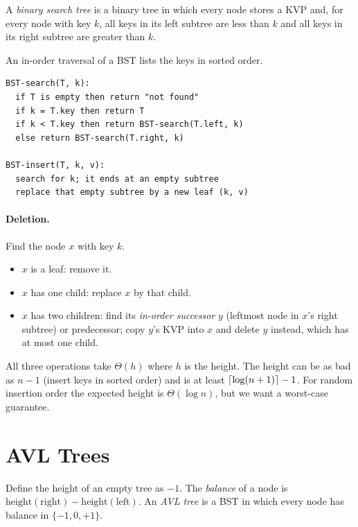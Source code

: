 \begin{definition}
A \emph{binary search tree} is a binary tree in which every node stores a KVP and,
for every node with key $k$, all keys in its left subtree are less than $k$ and
all keys in its right subtree are greater than $k$.
\end{definition}

An in-order traversal of a BST lists the keys in sorted order.

\begin{lstlisting}
BST-search(T, k):
  if T is empty then return "not found"
  if k = T.key then return T
  if k < T.key then return BST-search(T.left, k)
  else return BST-search(T.right, k)

BST-insert(T, k, v):
  search for k; it ends at an empty subtree
  replace that empty subtree by a new leaf (k, v)
\end{lstlisting}

\paragraph{Deletion.} Find the node $x$ with key $k$.
\begin{itemize}
  \item $x$ is a leaf: remove it.
  \item $x$ has one child: replace $x$ by that child.
  \item $x$ has two children: find its \emph{in-order successor} $y$ (leftmost node
        in $x$'s right subtree) or predecessor; copy $y$'s KVP into $x$ and delete
        $y$ instead, which has at most one child.
\end{itemize}

All three operations take $\Theta(h)$ where $h$ is the height. The height can
be as bad as $n - 1$ (insert keys in sorted order) and is at least
$\left\lceil \log(n+1) \right\rceil - 1$. For random insertion order the expected height is
$\Theta(\log n)$, but we want a worst-case guarantee.

\section{AVL Trees}

\begin{definition}
Define the height of an empty tree as $-1$. The \emph{balance} of a node is
$\text{height}(\text{right}) - \text{height}(\text{left})$. An \emph{AVL tree} is a
BST in which every node has balance in $\{-1, 0, +1\}$.
\end{definition}

